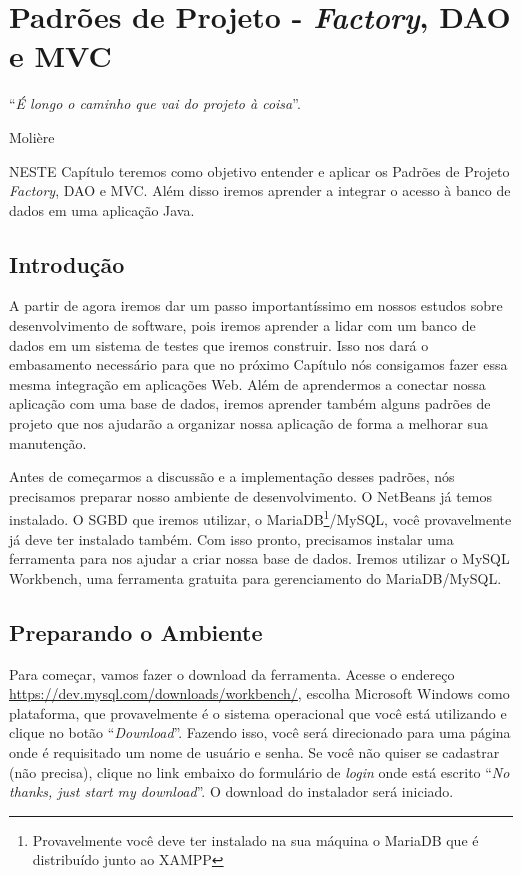 \chapter{Padrões de Projeto - \textit{Factory}, DAO e MVC}
\epigraph{``\textit{É longo o caminho que vai do projeto à coisa}''.}{Molière}

\lettrine[lines=4, lhang=0.1, lraise=0, loversize=0.2, findent=0.1em]{\textcolor{corAzulTema}{N}}{ESTE} Capítulo teremos como objetivo entender e aplicar os Padrões de Projeto \textit{Factory}, DAO e MVC. Além disso iremos aprender a integrar o acesso à banco de dados em uma aplicação Java.


\section{Introdução}

A partir de agora iremos dar um passo importantíssimo em nossos estudos sobre desenvolvimento de software, pois iremos aprender a lidar com um banco de dados em um sistema de testes que iremos construir. Isso nos dará o embasamento necessário para que no próximo Capítulo nós consigamos fazer essa mesma integração em aplicações Web. Além de aprendermos a conectar nossa aplicação com uma base de dados, iremos aprender também alguns padrões de projeto que nos ajudarão a organizar nossa aplicação de forma a melhorar sua manutenção. 

Antes de começarmos a discussão e a implementação desses padrões, nós precisamos preparar nosso ambiente de desenvolvimento. O NetBeans já temos instalado. O SGBD que iremos utilizar, o MariaDB\footnote{Provavelmente você deve ter instalado na sua máquina o MariaDB que é distribuído junto ao XAMPP}/MySQL, você provavelmente já deve ter instalado também. Com isso pronto, precisamos instalar uma ferramenta para nos ajudar a criar nossa base de dados. Iremos utilizar o MySQL Workbench, uma ferramenta gratuita para gerenciamento do MariaDB/MySQL. 


\section{Preparando o Ambiente}

Para começar, vamos fazer o download da ferramenta. Acesse o endereço \url{https://dev.mysql.com/downloads/workbench/}, escolha Microsoft Windows como plataforma, que provavelmente é o sistema operacional que você está utilizando e clique no botão ``\textit{Download}''. Fazendo isso, você será direcionado para uma página onde é requisitado um nome de usuário e senha. Se você não quiser se cadastrar (não precisa), clique no link embaixo do formulário de \textit{login} onde está escrito ``\textit{No thanks, just start my download}''. O download do instalador será iniciado.

